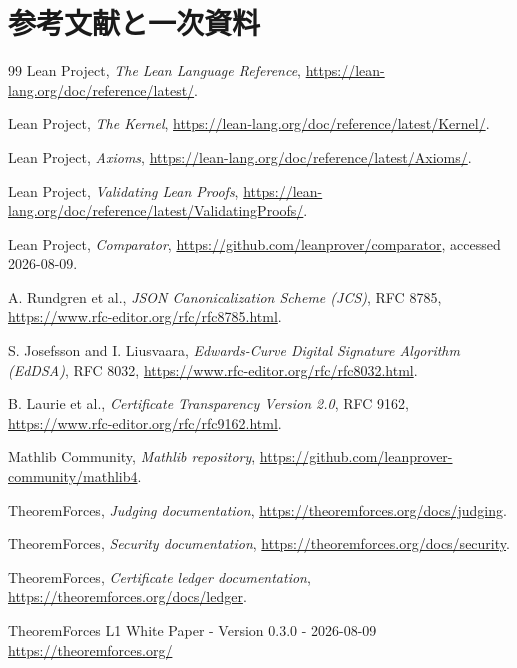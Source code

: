 \documentclass[a4paper,11pt]{ltjsarticle}
\begin{document}
\section{参考文献と一次資料}

\begin{thebibliography}{99}
Lean Project, \emph{The Lean Language Reference},
\url{https://lean-lang.org/doc/reference/latest/}.

Lean Project, \emph{The Kernel},
\url{https://lean-lang.org/doc/reference/latest/Kernel/}.

Lean Project, \emph{Axioms},
\url{https://lean-lang.org/doc/reference/latest/Axioms/}.

Lean Project, \emph{Validating Lean Proofs},
\url{https://lean-lang.org/doc/reference/latest/ValidatingProofs/}.

Lean Project, \emph{Comparator},
\url{https://github.com/leanprover/comparator}, accessed 2026-08-09.

A. Rundgren et al., \emph{JSON Canonicalization Scheme (JCS)}, RFC 8785,
\url{https://www.rfc-editor.org/rfc/rfc8785.html}.

S. Josefsson and I. Liusvaara, \emph{Edwards-Curve Digital Signature Algorithm (EdDSA)}, RFC 8032,
\url{https://www.rfc-editor.org/rfc/rfc8032.html}.

B. Laurie et al., \emph{Certificate Transparency Version 2.0}, RFC 9162,
\url{https://www.rfc-editor.org/rfc/rfc9162.html}.

Mathlib Community, \emph{Mathlib repository},
\url{https://github.com/leanprover-community/mathlib4}.

TheoremForces, \emph{Judging documentation},
\url{https://theoremforces.org/docs/judging}.

TheoremForces, \emph{Security documentation},
\url{https://theoremforces.org/docs/security}.

TheoremForces, \emph{Certificate ledger documentation},
\url{https://theoremforces.org/docs/ledger}.
\end{thebibliography}

\vfill
\begin{center}
\color{TFMuted}\small
TheoremForces L1 White Paper - Version 0.3.0 - 2026-08-09\\
\url{https://theoremforces.org/}
\end{center}
\end{document}
